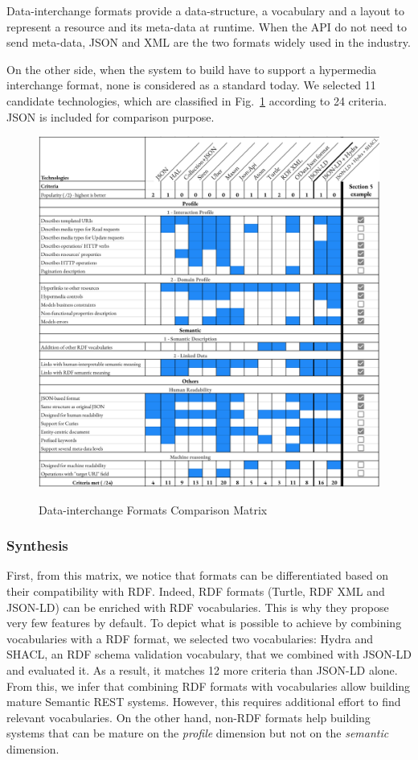 Data-interchange formats provide a data-structure, a vocabulary and a layout to represent a resource and its meta-data at runtime. When the API do not need to send meta-data, JSON and XML are the two formats widely used in the industry.

On the other side, when the system to build have to support a hypermedia interchange format, none is considered as a standard today. We selected 11 candidate technologies, which are classified in Fig.~\ref{interchange-formats-matrix} according to 24 criteria. JSON is included for comparison purpose.

\begin{figure}[!ht]
\caption{Data-interchange Formats Comparison Matrix}
\includegraphics[width=1\textwidth]{figures/DIF.png}
\label{interchange-formats-matrix}
\vspace*{-0.7cm}
\end{figure}

\subsubsection*{Synthesis}
First, from this matrix, we notice that formats can be differentiated based on their compatibility with RDF. Indeed, RDF formats (Turtle, RDF XML and JSON-LD) can be enriched with RDF vocabularies. This is why they propose very few features by default. To depict what is possible to achieve by combining vocabularies with a RDF format, we selected two vocabularies: Hydra and SHACL, an RDF schema validation vocabulary, that we combined with JSON-LD and evaluated it. As a result, it matches 12 more criteria than JSON-LD alone.
From this, we infer that combining RDF formats with vocabularies allow building mature Semantic REST systems. However, this requires additional effort to find relevant vocabularies.
On the other hand, non-RDF formats help building systems that can be mature on the \textit{profile} dimension but not on the \textit{semantic} dimension.

